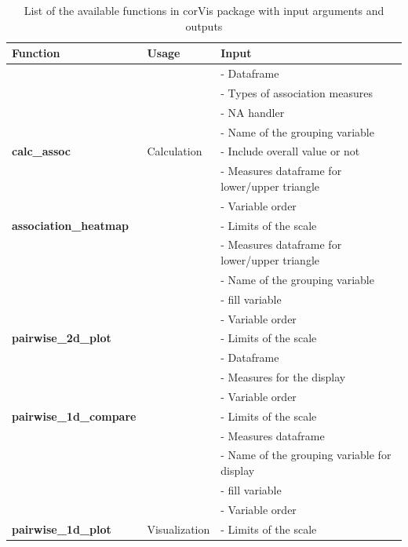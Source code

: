 \begin{Schunk}
\begin{table}

\caption{\label{tab:function-corVis}List of the available functions in corVis package with input arguments and outputs}
\centering
\begin{tabular}[t]{>{}lll}
\toprule
Function & Usage & Input\\
\midrule
 &  & - Dataframe\\
\cmidrule{3-3}
 &  & - Types of association measures\\
\cmidrule{3-3}
 &  & - NA handler\\
\cmidrule{3-3}
 &  & - Name of the grouping variable\\
\cmidrule{3-3}
\multirow{-5}{*}{\raggedright\arraybackslash \textbf{calc\_assoc}} & \multirow{-5}{*}{\raggedright\arraybackslash Calculation} & - Include overall value or not\\
\cmidrule{1-3}
 &  & - Measures dataframe for lower/upper triangle\\
\cmidrule{3-3}
 &  & - Variable order\\
\cmidrule{3-3}
\multirow{-3}{*}{\raggedright\arraybackslash \textbf{association\_heatmap}} &  & - Limits of the scale\\
\cmidrule{1-1}
\cmidrule{3-3}
 &  & - Measures dataframe for lower/upper triangle\\
\cmidrule{3-3}
 &  & - Name of the grouping variable\\
\cmidrule{3-3}
 &  & - fill variable\\
\cmidrule{3-3}
 &  & - Variable order\\
\cmidrule{3-3}
\multirow{-5}{*}{\raggedright\arraybackslash \textbf{pairwise\_2d\_plot}} &  & - Limits of the scale\\
\cmidrule{1-1}
\cmidrule{3-3}
 &  & - Dataframe\\
\cmidrule{3-3}
 &  & - Measures for the display\\
\cmidrule{3-3}
 &  & - Variable order\\
\cmidrule{3-3}
\multirow{-4}{*}{\raggedright\arraybackslash \textbf{pairwise\_1d\_compare}} &  & - Limits of the scale\\
\cmidrule{1-1}
\cmidrule{3-3}
 &  & - Measures dataframe\\
\cmidrule{3-3}
 &  & - Name of the grouping variable for display\\
\cmidrule{3-3}
 &  & - fill variable\\
\cmidrule{3-3}
 &  & - Variable order\\
\cmidrule{3-3}
\multirow{-5}{*}{\raggedright\arraybackslash \textbf{pairwise\_1d\_plot}} & \multirow{-17}{*}{\raggedright\arraybackslash Visualization} & - Limits of the scale\\
\bottomrule
\end{tabular}
\end{table}

\end{Schunk}

